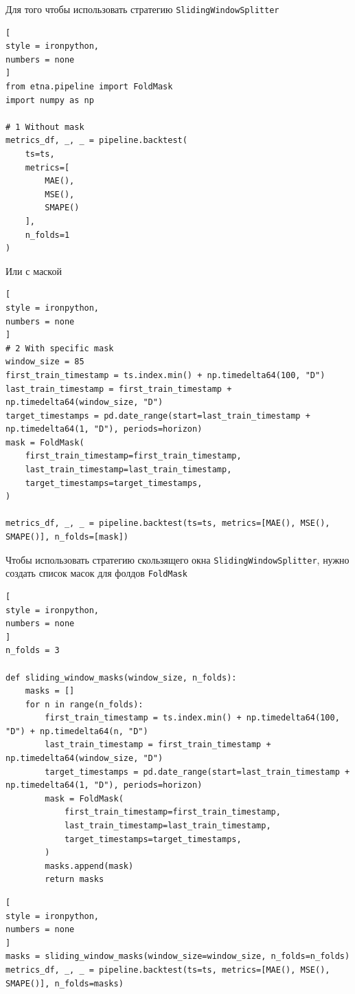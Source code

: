 \documentclass[%
	11pt,
	a4paper,
	utf8,
		]{article}
\begin{document}
Для того чтобы использовать стратегию \verb|SlidingWindowSplitter|
\begin{lstlisting}[
style = ironpython,
numbers = none
]
from etna.pipeline import FoldMask
import numpy as np

# 1 Without mask
metrics_df, _, _ = pipeline.backtest(
    ts=ts,
    metrics=[
        MAE(),
        MSE(),
        SMAPE()
    ],
    n_folds=1
)
\end{lstlisting}

Или с маской
\begin{lstlisting}[
style = ironpython,
numbers = none
]
# 2 With specific mask
window_size = 85
first_train_timestamp = ts.index.min() + np.timedelta64(100, "D")
last_train_timestamp = first_train_timestamp + np.timedelta64(window_size, "D")
target_timestamps = pd.date_range(start=last_train_timestamp + np.timedelta64(1, "D"), periods=horizon)
mask = FoldMask(
	first_train_timestamp=first_train_timestamp,
	last_train_timestamp=last_train_timestamp,
	target_timestamps=target_timestamps,
)

metrics_df, _, _ = pipeline.backtest(ts=ts, metrics=[MAE(), MSE(), SMAPE()], n_folds=[mask])
\end{lstlisting}

Чтобы использовать стратегию скользящего окна \verb|SlidingWindowSplitter|, нужно создать список масок для фолдов \verb|FoldMask|
\begin{lstlisting}[
style = ironpython,
numbers = none
]
n_folds = 3

def sliding_window_masks(window_size, n_folds):
	masks = []
	for n in range(n_folds):
		first_train_timestamp = ts.index.min() + np.timedelta64(100, "D") + np.timedelta64(n, "D")
		last_train_timestamp = first_train_timestamp + np.timedelta64(window_size, "D")
		target_timestamps = pd.date_range(start=last_train_timestamp + np.timedelta64(1, "D"), periods=horizon)
		mask = FoldMask(
			first_train_timestamp=first_train_timestamp,
			last_train_timestamp=last_train_timestamp,
			target_timestamps=target_timestamps,
		)
		masks.append(mask)
		return masks
\end{lstlisting}

\begin{lstlisting}[
style = ironpython,
numbers = none
]
masks = sliding_window_masks(window_size=window_size, n_folds=n_folds)
metrics_df, _, _ = pipeline.backtest(ts=ts, metrics=[MAE(), MSE(), SMAPE()], n_folds=masks)
\end{lstlisting}
\end{document}
